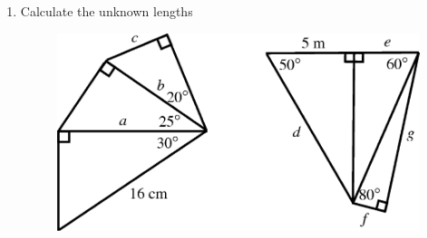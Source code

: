       
      \label{m39414*id92202}\begin{enumerate}[noitemsep, label=\textbf{\arabic*}. ] 
            \label{m39414*uid98}\item Calculate the unknown lengths


    \setcounter{subfigure}{0}


	\begin{figure}[H] %
    \begin{center}
    \label{m39414*id92222!!!underscore!!!media}\label{m39414*id92222!!!underscore!!!printimage}\includegraphics{col11306.imgs/m39414_MG10C15_041.png} %
        
      \vspace{2pt}
    \vspace{.1in}
    
    \end{center}

 \end{figure}   


\end{enumerate}
